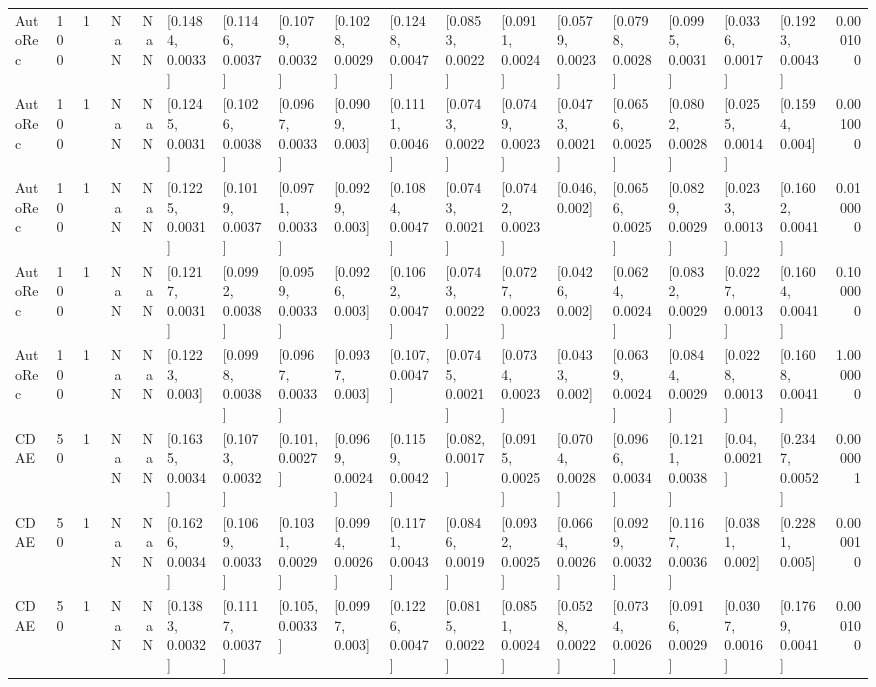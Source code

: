 \begin{tabular}{lllrrllllllllllllr}
 AutoRec &  100 &     1 &   NaN &   NaN &  [0.1484, 0.0033] &  [0.1146, 0.0037] &  [0.1079, 0.0032] &  [0.1028, 0.0029] &  [0.1248, 0.0047] &  [0.0853, 0.0022] &  [0.0911, 0.0024] &  [0.0579, 0.0023] &  [0.0798, 0.0028] &  [0.0995, 0.0031] &  [0.0336, 0.0017] &  [0.1923, 0.0043] &  0.000100 \\
 AutoRec &  100 &     1 &   NaN &   NaN &  [0.1245, 0.0031] &  [0.1026, 0.0038] &  [0.0967, 0.0033] &   [0.0909, 0.003] &  [0.1111, 0.0046] &  [0.0743, 0.0022] &  [0.0749, 0.0023] &  [0.0473, 0.0021] &  [0.0656, 0.0025] &  [0.0802, 0.0028] &  [0.0255, 0.0014] &   [0.1594, 0.004] &  0.001000 \\
 AutoRec &  100 &     1 &   NaN &   NaN &  [0.1225, 0.0031] &  [0.1019, 0.0037] &  [0.0971, 0.0033] &   [0.0929, 0.003] &  [0.1084, 0.0047] &  [0.0743, 0.0021] &  [0.0742, 0.0023] &    [0.046, 0.002] &  [0.0656, 0.0025] &  [0.0829, 0.0029] &  [0.0233, 0.0013] &  [0.1602, 0.0041] &  0.010000 \\
 AutoRec &  100 &     1 &   NaN &   NaN &  [0.1217, 0.0031] &  [0.0992, 0.0038] &  [0.0959, 0.0033] &   [0.0926, 0.003] &  [0.1062, 0.0047] &  [0.0743, 0.0022] &  [0.0727, 0.0023] &   [0.0426, 0.002] &  [0.0624, 0.0024] &  [0.0832, 0.0029] &  [0.0227, 0.0013] &  [0.1604, 0.0041] &  0.100000 \\
 AutoRec &  100 &     1 &   NaN &   NaN &   [0.1223, 0.003] &  [0.0998, 0.0038] &  [0.0967, 0.0033] &   [0.0937, 0.003] &   [0.107, 0.0047] &  [0.0745, 0.0021] &  [0.0734, 0.0023] &   [0.0433, 0.002] &  [0.0639, 0.0024] &  [0.0844, 0.0029] &  [0.0228, 0.0013] &  [0.1608, 0.0041] &  1.000000 \\
    CDAE &   50 &     1 &   NaN &   NaN &  [0.1635, 0.0034] &  [0.1073, 0.0032] &   [0.101, 0.0027] &  [0.0969, 0.0024] &  [0.1159, 0.0042] &   [0.082, 0.0017] &  [0.0915, 0.0025] &  [0.0704, 0.0028] &  [0.0966, 0.0034] &  [0.1211, 0.0038] &    [0.04, 0.0021] &  [0.2347, 0.0052] &  0.000001 \\
    CDAE &   50 &     1 &   NaN &   NaN &  [0.1626, 0.0034] &  [0.1069, 0.0033] &  [0.1031, 0.0029] &  [0.0994, 0.0026] &  [0.1171, 0.0043] &  [0.0846, 0.0019] &  [0.0932, 0.0025] &  [0.0664, 0.0026] &  [0.0929, 0.0032] &  [0.1167, 0.0036] &   [0.0381, 0.002] &   [0.2281, 0.005] &  0.000010 \\
    CDAE &   50 &     1 &   NaN &   NaN &  [0.1383, 0.0032] &  [0.1117, 0.0037] &   [0.105, 0.0033] &   [0.0997, 0.003] &  [0.1226, 0.0047] &  [0.0815, 0.0022] &  [0.0851, 0.0024] &  [0.0528, 0.0022] &  [0.0734, 0.0026] &  [0.0916, 0.0029] &  [0.0307, 0.0016] &  [0.1769, 0.0041] &  0.000100 \\

\end{tabular}
